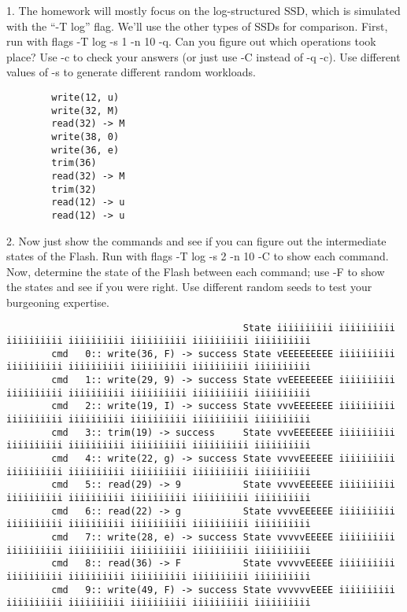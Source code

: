 \documentclass{article}
\begin{document}
    1. The homework will mostly focus on the log-structured SSD, which
    is simulated with the “-T log” flag. We’ll use the other types of
    SSDs for comparison. First, run with flags -T log -s 1 -n 10
    -q. Can you figure out which operations took place? Use -c to
    check your answers (or just use -C instead of -q -c). Use different
    values of -s to generate different random workloads.
\scriptsize {
    \begin{verbatim}
        write(12, u)
        write(32, M)
        read(32) -> M
        write(38, 0)
        write(36, e)
        trim(36)
        read(32) -> M
        trim(32)
        read(12) -> u
        read(12) -> u
    \end{verbatim}
}
    2. Now just show the commands and see if you can figure out the
    intermediate states of the Flash. Run with flags -T log -s 2 -n
    10 -C to show each command. Now, determine the state of the
    Flash between each command; use -F to show the states and see if
    you were right. Use different random seeds to test your burgeoning
    expertise.
    \scriptsize {
        \begin{verbatim}
                                          State iiiiiiiiii iiiiiiiiii iiiiiiiiii iiiiiiiiii iiiiiiiiii iiiiiiiiii iiiiiiiiii
        cmd   0:: write(36, F) -> success State vEEEEEEEEE iiiiiiiiii iiiiiiiiii iiiiiiiiii iiiiiiiiii iiiiiiiiii iiiiiiiiii
        cmd   1:: write(29, 9) -> success State vvEEEEEEEE iiiiiiiiii iiiiiiiiii iiiiiiiiii iiiiiiiiii iiiiiiiiii iiiiiiiiii
        cmd   2:: write(19, I) -> success State vvvEEEEEEE iiiiiiiiii iiiiiiiiii iiiiiiiiii iiiiiiiiii iiiiiiiiii iiiiiiiiii
        cmd   3:: trim(19) -> success     State vvvEEEEEEE iiiiiiiiii iiiiiiiiii iiiiiiiiii iiiiiiiiii iiiiiiiiii iiiiiiiiii
        cmd   4:: write(22, g) -> success State vvvvEEEEEE iiiiiiiiii iiiiiiiiii iiiiiiiiii iiiiiiiiii iiiiiiiiii iiiiiiiiii
        cmd   5:: read(29) -> 9           State vvvvEEEEEE iiiiiiiiii iiiiiiiiii iiiiiiiiii iiiiiiiiii iiiiiiiiii iiiiiiiiii
        cmd   6:: read(22) -> g           State vvvvEEEEEE iiiiiiiiii iiiiiiiiii iiiiiiiiii iiiiiiiiii iiiiiiiiii iiiiiiiiii
        cmd   7:: write(28, e) -> success State vvvvvEEEEE iiiiiiiiii iiiiiiiiii iiiiiiiiii iiiiiiiiii iiiiiiiiii iiiiiiiiii
        cmd   8:: read(36) -> F           State vvvvvEEEEE iiiiiiiiii iiiiiiiiii iiiiiiiiii iiiiiiiiii iiiiiiiiii iiiiiiiiii
        cmd   9:: write(49, F) -> success State vvvvvvEEEE iiiiiiiiii iiiiiiiiii iiiiiiiiii iiiiiiiiii iiiiiiiiii iiiiiiiiii
        \end{verbatim}
    }
\end{document}
